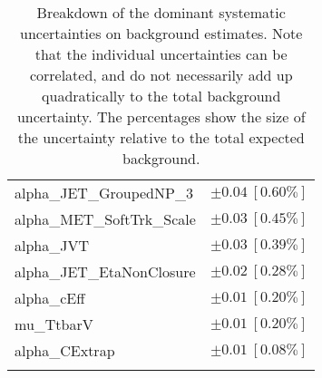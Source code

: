 \begin{table}
\begin{center}
\begin{tabular*}{\textwidth}{@{\extracolsep{\fill}}lc}
alpha\_JET\_GroupedNP\_3         & $\pm 0.04\ [0.60\%] $       \\
alpha\_MET\_SoftTrk\_Scale         & $\pm 0.03\ [0.45\%] $       \\
alpha\_JVT         & $\pm 0.03\ [0.39\%] $       \\
alpha\_JET\_EtaNonClosure         & $\pm 0.02\ [0.28\%] $       \\
alpha\_cEff         & $\pm 0.01\ [0.20\%] $       \\
mu\_TtbarV         & $\pm 0.01\ [0.20\%] $       \\
alpha\_CExtrap         & $\pm 0.01\ [0.08\%] $       \\
\noalign{\smallskip}\hline\noalign{\smallskip}
\end{tabular*}
\end{center}
\caption[Breakdown of uncertainty on background estimates]{
Breakdown of the dominant systematic uncertainties on background estimates.
Note that the individual uncertainties can be correlated, and do not necessarily add up quadratically to 
the total background uncertainty. The percentages show the size of the uncertainty relative to the total expected background.
\label{table.results.bkgestimate.uncertainties.SRC4}}
\end{table}
%